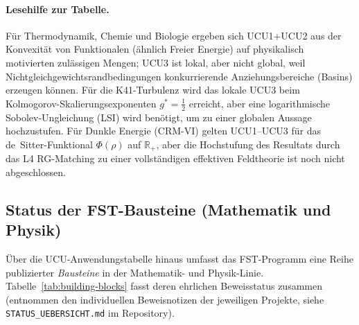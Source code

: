 \documentclass[11pt,a4paper]{article}
\theoremstyle{remark}
\begin{document}
\paragraph{Lesehilfe zur Tabelle.}
Für Thermodynamik, Chemie und Biologie ergeben sich UCU1+UCU2 aus der Konvexität von Funktionalen (ähnlich Freier Energie) auf physikalisch motivierten zulässigen Mengen; UCU3 ist lokal, aber nicht global, weil Nichtgleichgewichtsrandbedingungen konkurrierende Anziehungsbereiche (Basins) erzeugen können. Für die K41-Turbulenz wird das lokale UCU3 beim Kolmogorov-Skalierungsexponenten $g^*=\tfrac12$ erreicht, aber eine logarithmische Sobolev-Ungleichung (LSI) wird benötigt, um zu einer globalen Aussage hochzustufen. Für Dunkle Energie (CRM-VI) gelten UCU1--UCU3 für das de~Sitter-Funktional $\Phi(\rho)$ auf $\mathbb{R}_+$, aber die Hochstufung des Resultats durch das L4 RG-Matching zu einer vollständigen effektiven Feldtheorie ist noch nicht abgeschlossen.

\subsection{Status der FST-Bausteine (Mathematik und Physik)}
\label{subsec:building-blocks}

Über die UCU-Anwendungstabelle hinaus umfasst das FST-Programm eine Reihe
publizierter \emph{Bausteine} in der Mathematik- und Physik-Linie.
Tabelle~\ref{tab:building-blocks} fasst deren ehrlichen Beweisstatus
zusammen (entnommen den individuellen Beweisnotizen der jeweiligen
Projekte, siehe \texttt{STATUS\_UEBERSICHT.md} im Repository).
\end{document}
